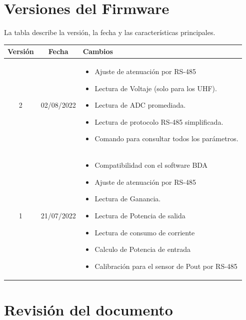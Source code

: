 \documentclass[12pt,twoside,onecolumn]{article}
\begin{document}
\section{Versiones del Firmware}
La tabla describe la versión, la fecha y las características principales.
\begin{center}
\begin{tabular}{||c | c | |m{10cm}| ||} 
 \hline
Versión & Fecha & Cambios \\ [0.5ex] 
\hline

 2 & 02/08/2022 & \begin{itemize}
 \setlength\itemsep{-0.1em}
\item Ajuste de atenuación por RS-485
\item Lectura de Voltaje (solo para los UHF).
\item Lectura de ADC promediada.
\item Lectura de protocolo RS-485 simplificada.
\item Comando para consultar todos los parámetros.
 \end{itemize}
 \\ 
 \hline
 1 & 21/07/2022 & \begin{itemize}
 \setlength\itemsep{-0.1em}
     \item Compatibilidad con el software BDA
\item Ajuste de atenuación por RS-485
\item Lectura de Ganancia.
\item Lectura de Potencia de salida
\item Lectura de consumo de corriente
\item Calculo de Potencia de entrada
\item Calibración para el sensor de Pout por RS-485
 \end{itemize}
 \\ 
\hline

\end{tabular}
\end{center}
\newpage

\section{Revisión del documento}
\end{document}
